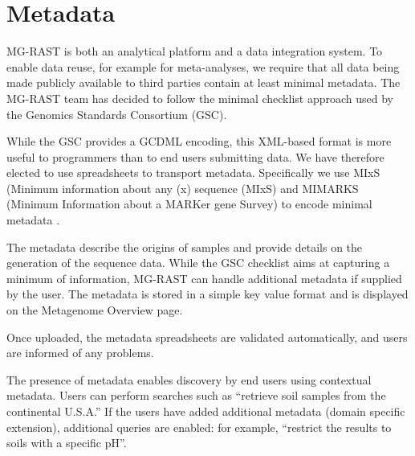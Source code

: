 \documentclass[12pt,fullpage]{report}
\begin{document}
\section{Metadata}
\label{section:metadata}

MG-RAST is both an analytical platform and a data integration system. To enable data reuse, for example for meta-analyses, we require that all data being made publicly available to third parties contain at least minimal metadata. The MG-RAST team has decided to follow the minimal checklist approach used by the Genomics Standards Consortium (GSC)\cite{GSC}.

While the GSC provides a GCDML \cite{GCDML} encoding, this XML-based format is more useful to programmers than to end users submitting data.
We have therefore elected to use spreadsheets to transport metadata. Specifically we use MIxS (Minimum information about any (x) sequence (MIxS) and MIMARKS (Minimum Information about a MARKer gene Survey) to encode minimal metadata \cite{MIENS}.

The metadata describe the origins of samples and provide details on the generation of the sequence data. While the GSC checklist aims at capturing a minimum of information, MG-RAST can handle additional metadata if supplied by the user. The metadata is stored in a simple key value format and is displayed on the Metagenome Overview page.

Once uploaded, the metadata spreadsheets are validated automatically, and users are informed of any problems.

The presence of metadata enables discovery by end users using contextual metadata. Users can perform searches such as ``retrieve soil samples from the continental U.S.A.'' If the users have added additional metadata (domain specific extension), additional queries are enabled: for example, ``restrict the results to soils with a specific pH''.
\end{document}
